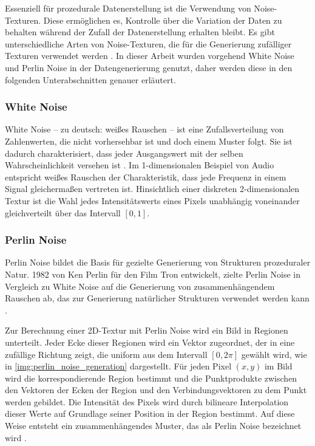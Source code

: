 Essenziell für prozedurale Datenerstellung ist die Verwendung von Noise-Texturen. Diese ermöglichen es, Kontrolle über die Variation der Daten zu behalten während der Zufall der Datenerstellung erhalten bleibt. Es gibt unterschiedliche Arten von Noise-Texturen, die für die Generierung zufälliger Texturen verwendet werden \cite{noise_generation}. In dieser Arbeit wurden vorgehend White Noise und Perlin Noise in der Datengenerierung genutzt, daher werden diese in den folgenden Unterabschnitten genauer erläutert.

\subsubsection{White Noise}

White Noise -- zu deutsch: weißes Rauschen -- ist eine Zufallsverteilung von Zahlenwerten, die nicht vorhersehbar ist und doch einem Muster folgt. Sie ist dadurch charakterisiert, dass jeder Ausgangswert mit der selben Wahrscheinlichkeit versehen ist \cite{white_noise}. Im 1-dimensionalen Beispiel von Audio entspricht weißes Rauschen der Charakteristik, dass jede Frequenz in einem Signal gleichermaßen vertreten ist. Hinsichtlich einer diskreten 2-dimensionalen Textur ist die Wahl jedes Intensitätswerts eines Pixels unabhängig voneinander gleichverteilt über das Intervall $[0, 1]$.

\subsubsection{Perlin Noise}

Perlin Noise bildet die Basis für gezielte Generierung von Strukturen prozeduraler Natur. 1982 von Ken Perlin für den Film Tron entwickelt, zielte Perlin Noise in Vergleich zu White Noise auf die Generierung von zusammenhängendem Rauschen ab, das zur Generierung natürlicher Strukturen verwendet werden kann \cite{perlin_noise_original,perlin_noise_extension}.

Zur Berechnung einer 2D-Textur mit Perlin Noise wird ein Bild in Regionen unterteilt. Jeder Ecke dieser Regionen wird ein Vektor zugeordnet, der in eine zufällige Richtung zeigt, die uniform aus dem Intervall $[0, 2\pi]$ gewählt wird, wie in \autoref{img:perlin_noise_generation} dargestellt. Für jeden Pixel $(x, y)$ im Bild wird die korrespondierende Region bestimmt und die Punktprodukte zwischen den Vektoren der Ecken der Region und den Verbindungsvektoren zu dem Punkt werden gebildet. Die Intensität des Pixels wird durch bilineare Interpolation dieser Werte auf Grundlage seiner Position in der Region bestimmt. Auf diese Weise entsteht ein zusammenhängendes Muster, das als Perlin Noise bezeichnet wird \cite{perlin_noise_original}.

